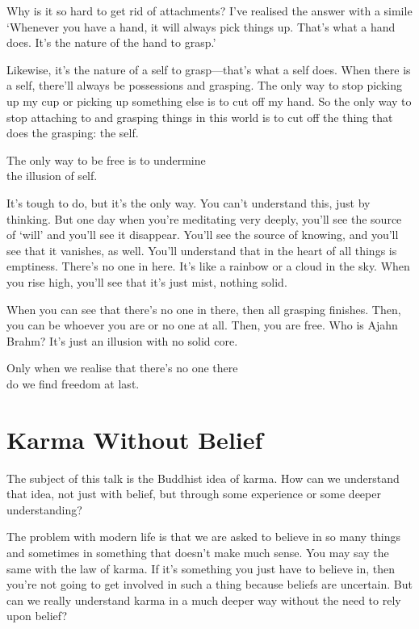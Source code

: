 \documentclass[12pt, openany]{book}
\newenvironment{aphorism}%
{%
\begin{center}\begin{itshape}
}%
{\end{itshape}\end{center}
}%
\newcommand{\fleuron}{%
\begin{center}
\vspace{2em}
\fallbackfont{❦}
\end{center}
}
\begin{document}
Why is it so hard to get rid of attachments? I’ve realised the answer with a simile ‘Whenever you have a hand, it will always pick things up. That’s what a hand does. It’s the nature of the hand to grasp.’ 

Likewise, it’s the nature of a self to grasp—that’s what a self does. When there is a self, there’ll always be possessions and grasping. The only way to stop picking up my cup or picking up something else is to cut off my hand. So the only way to stop attaching to and grasping things in this world is to cut off the thing that does the grasping: the self. 

\begin{aphorism}
The only way to be free is to undermine\\  
the illusion of self.
\end{aphorism}

It’s tough to do, but it’s the only way. You can’t understand this, just by thinking. But one day when you’re meditating very deeply, you’ll see the source of ‘will’ and you’ll see it disappear. You’ll see the source of knowing, and you’ll see that it vanishes, as well. You’ll understand that in the heart of all things is emptiness. There’s no one in here. It’s like a rainbow or a cloud in the sky. When you rise high, you’ll see that it’s just mist, nothing solid. 

When you can see that there’s no one in there, then all grasping finishes. Then, you can be whoever you are or no one at all. Then, you are free. Who is Ajahn Brahm? It’s just an illusion with no solid core. 

\begin{aphorism}
Only when we realise that there’s no one there\\  
do we find freedom at last.
\end{aphorism}

\fleuron

\chapter{Karma Without Belief} 

The subject of this talk is the Buddhist idea of karma. How can we understand that idea, not just with belief, but through some experience or some deeper understanding? 

The problem with modern life is that we are asked to believe in so many things and sometimes in something that doesn’t make much sense. You may say the same with the law of karma. If it’s something you just have to believe in, then you’re not going to get involved in such a thing because beliefs are uncertain. But can we really understand karma in a much deeper way without the need to rely upon belief? 
\end{document}
